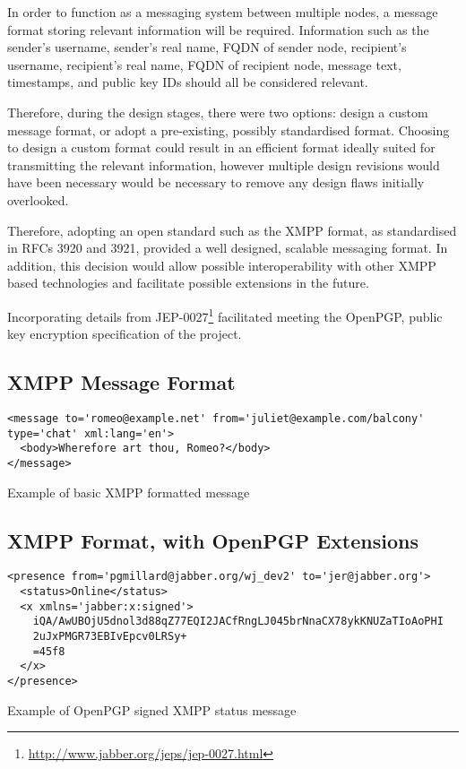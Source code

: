 
In order to function as a messaging system between multiple nodes, a
message format storing relevant information will be required. 
Information such as the sender's username, sender's real name, FQDN of 
sender node, recipient's username, recipient's real name, FQDN of 
recipient node, message text, timestamps, and public key IDs should all
be considered relevant. 


Therefore, during the design stages, there were two options: design a 
custom message format, or adopt a pre-existing, possibly standardised 
format. Choosing to design a custom format could result in an efficient 
format ideally suited for transmitting the relevant information, 
however multiple design revisions would have been necessary would be
necessary to remove any design flaws initially overlooked. 


Therefore, adopting an open standard such as the XMPP format, as 
standardised in RFCs 3920 and 3921, provided a well designed, scalable 
messaging format. In addition, this decision would allow possible 
interoperability with other XMPP based technologies and facilitate 
possible extensions in the future.


Incorporating details from
JEP-0027\footnote{\url{http://www.jabber.org/jeps/jep-0027.html}} 
facilitated meeting the OpenPGP, public key encryption 
specification of the project.

\subsection{XMPP Message Format}

\begin{table}[hbt]

\begin{verbatim}
<message to='romeo@example.net' from='juliet@example.com/balcony' 
type='chat' xml:lang='en'>
  <body>Wherefore art thou, Romeo?</body>
</message>
\end{verbatim}

\caption{Example of basic XMPP formatted message}

\end{table}


\subsection{XMPP Format, with OpenPGP Extensions}


\begin{table}[hbt]

\begin{verbatim}
<presence from='pgmillard@jabber.org/wj_dev2' to='jer@jabber.org'>
  <status>Online</status>
  <x xmlns='jabber:x:signed'>
    iQA/AwUBOjU5dnol3d88qZ77EQI2JACfRngLJ045brNnaCX78ykKNUZaTIoAoPHI
    2uJxPMGR73EBIvEpcv0LRSy+
    =45f8
  </x>
</presence>
\end{verbatim}

\caption{Example of OpenPGP signed XMPP status message}

\end{table}


